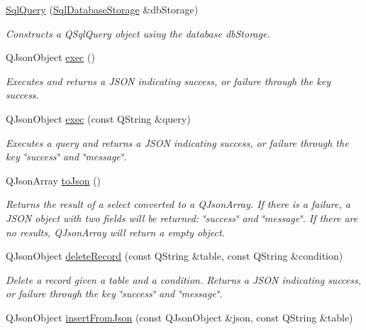 \begin{DoxyCompactItemize}
\item 
\hyperlink{class_sql_query_a81ec51c1f78134ed0d5016774335460c}{Sql\+Query} (\hyperlink{class_sql_database_storage}{Sql\+Database\+Storage} \&db\+Storage)
\begin{DoxyCompactList}\small\item\em Constructs a Q\+Sql\+Query object using the database db\+Storage. \end{DoxyCompactList}\item 
Q\+Json\+Object \hyperlink{class_sql_query_a2e52ed76e3683d7684fd792bec0b9a09}{exec} ()
\begin{DoxyCompactList}\small\item\em Executes and returns a J\+S\+ON indicating success, or failure through the key success. \end{DoxyCompactList}\item 
Q\+Json\+Object \hyperlink{class_sql_query_a5fa16018f76ee798660343bc5fabe8a0}{exec} (const Q\+String \&query)
\begin{DoxyCompactList}\small\item\em Executes a query and returns a J\+S\+ON indicating success, or failure through the key \char`\"{}success\char`\"{} and \char`\"{}message\char`\"{}. \end{DoxyCompactList}\item 
Q\+Json\+Array \hyperlink{class_sql_query_a4f12c62fa99bb2f5738b54e5cbefa0f9}{to\+Json} ()
\begin{DoxyCompactList}\small\item\em Returns the result of a select converted to a Q\+Json\+Array. If there is a failure, a J\+S\+ON object with two fields will be returned\+: \char`\"{}success\char`\"{} and \char`\"{}message\char`\"{}. If there are no results, Q\+Json\+Array will return a empty object. \end{DoxyCompactList}\item 
Q\+Json\+Object \hyperlink{class_sql_query_a5bf880f51ea330bbccc5815fac1430f2}{delete\+Record} (const Q\+String \&table, const Q\+String \&condition)
\begin{DoxyCompactList}\small\item\em Delete a record given a table and a condition. Returns a J\+S\+ON indicating success, or failure through the key \char`\"{}success\char`\"{} and \char`\"{}message\char`\"{}. \end{DoxyCompactList}\item 
Q\+Json\+Object \hyperlink{class_sql_query_ad831477c3ce9914f7dcd8136e72af387}{insert\+From\+Json} (const Q\+Json\+Object \&json, const Q\+String \&table)

\end{DoxyCompactItemize}
